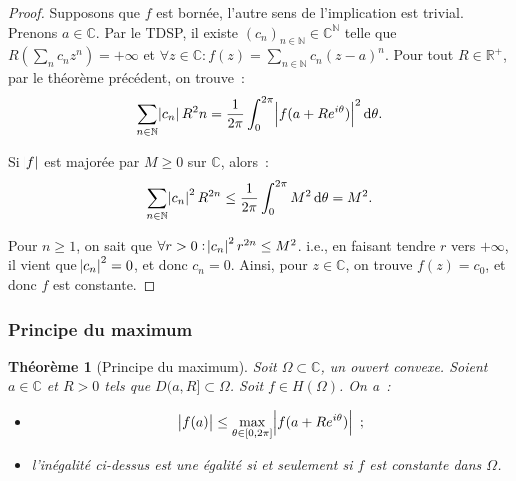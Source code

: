 \documentclass{report}
\newtheorem{thm}{Théorème}[chapter]
\theoremstyle{definition}
\theoremstyle{remark}
\numberwithin{equation}{section}
\newcommand{\C}{\mathbb C}
\newcommand{\R}{\mathbb R}
\newcommand{\N}{\mathbb N}
\newcommand{\pinfty}{{+\infty}}
\begin{document}
			\begin{proof} Supposons que $f$ est bornée, l'autre sens de l'implication est trivial. Prenons $a \in \C$. Par le TDSP, il existe $(c_n)_{n \in \N} \in \C^\N$
			telle que $R(\sum_n c_nz^n) = \pinfty$ et $\forall z \in \C : f(z) = \sum_{n \in \N}c_n(z-a)^n$. Pour tout $R \in \R^+$, par le théorème précédent, on trouve~:
			\begin{equation}
				\sum_{n \in \N}\abs {c_n}R^2n = \frac 1{2\pi}\int_0^{2\pi}\abs {f(a+Re^{i\theta})}^2\dif \theta.
			\end{equation}

			Si $\abs f$ est majorée par $M \geq 0$ sur $\C$, alors~:
			\begin{equation}
				\sum_{n \in \N}\abs {c_n}^2R^{2n} \leq \frac 1{2\pi}\int_0^{2\pi}M^2\dif \theta = M^2.
			\end{equation}

			Pour $n \geq 1$, on sait que $\forall r > 0 : \abs {c_n}^2r^{2n} \leq M^2$. i.e., en faisant tendre $r$ vers $\pinfty$, il vient que $\abs {c_n}^2 = 0$,
			et donc $c_n = 0$. Ainsi, pour $z \in \C$, on trouve $f(z) = c_0$, et donc $f$ est constante.
			\end{proof}

		\subsubsection{Principe du maximum}
			\begin{thm}[Principe du maximum] Soit $\Omega \subset \C$, un ouvert convexe. Soient $a \in \C$ et $R > 0$ tels que $D(a, R] \subset \Omega$.
			Soit $f \in H(\Omega)$. On a~:
			\begin{itemize}
				\item[$(i)$]  \begin{equation}\label{eq:principe max}\abs {f(a)} \leq \max_{\theta \in [0, 2\pi]}\abs {f(a+Re^{i\theta})}~;\end{equation}
				\item[$(ii)$] l'inégalité ci-dessus est une égalité si et seulement si $f$ est constante dans $\Omega$.
			\end{itemize}
			\end{thm}
\end{document}
